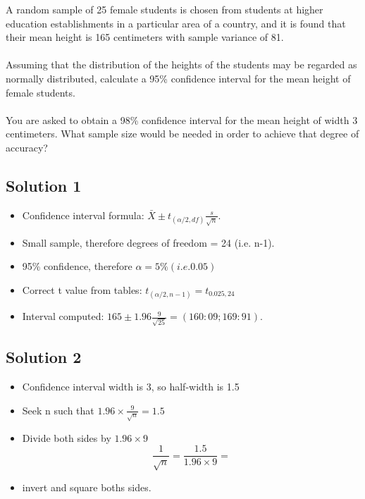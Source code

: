 \documentclass[12pt]{article}
\begin{document}
\noindent A random sample of 25 female students is chosen from
students at higher education establishments in a particular area
of a country, and it is found that their mean height is 165
centimeters with sample variance of 81.
\\
\\
Assuming that the distribution of the heights of the students may
be regarded as normally distributed, calculate a 95\% confidence
interval for the mean height of female students.
\\
\\
You are asked to obtain a 98\% confidence interval for the mean
height of width 3 centimeters. What sample size would be needed in
order to achieve that degree of accuracy?

\subsection*{Solution 1}

\begin{itemize}
\item Confidence interval formula: $\bar{X} \pm t_{(\alpha/2,df)}
\frac{s}{\sqrt{n}}$.

\item Small sample, therefore degrees of freedom = 24 (i.e. n-1).

\item 95\% confidence, therefore $\alpha = 5\% (i.e. 0.05)$

\item Correct t value from tables: $t_{(\alpha /2,n-1)} =
t_{0.025,24} $

\item Interval computed: $165 \pm 1.96 \frac{9}{\sqrt{25}}  =
(160:09; 169:91).$
\end{itemize}


\subsection*{Solution 2}

\begin{itemize}
\item Confidence interval width is 3, so half-width is 1.5

\item Seek n such that $1.96 \times \frac{9}{\sqrt{n}} = 1.5$

\item Divide both sides by $1.96 \times 9$ \\
\[\frac{1}{\sqrt{n}} = \frac{1.5}{1.96 \times 9} =\]


\item invert and square boths sides.
\end{itemize}
\end{document}
